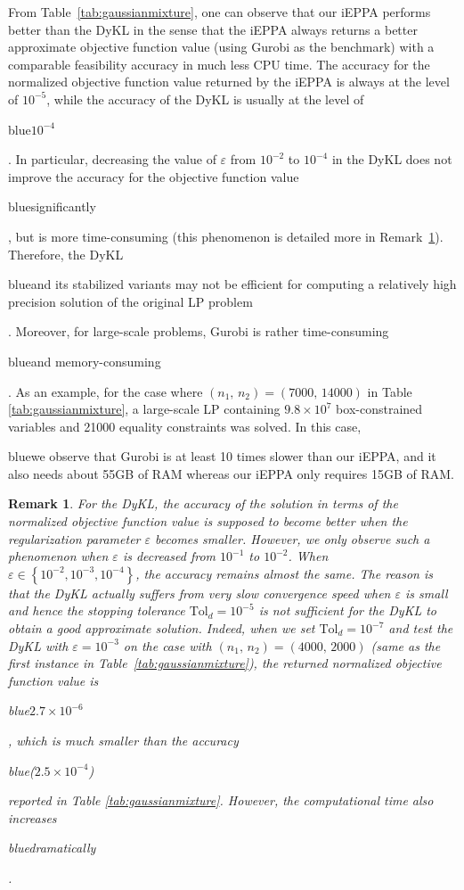 \documentclass[10pt]{article}
\newcommand{\blue}[1]{\begin{color}{blue}#1\end{color}}
\newtheorem{remark}{Remark}
\begin{document}
From Table~\ref{tab:gaussianmixture}, one can observe that our iEPPA performs better than the DyKL in the sense that the iEPPA always returns a better approximate objective function value (using Gurobi as the benchmark) with a comparable feasibility accuracy in much less CPU time. The accuracy for the normalized objective function value returned by the iEPPA is always at the level of $10^{-5}$, while the accuracy of the DyKL is usually at the level of \blue{$10^{-4}$}. In particular, decreasing the value of $\varepsilon$ from $10^{-2}$ to $10^{-4}$ in the DyKL does not improve the accuracy for the objective function value \blue{significantly}, but is more time-consuming (this phenomenon is detailed more in Remark~\ref{rmk:accdykl}). Therefore, the DyKL \blue{and its stabilized variants may not be efficient for computing a relatively high precision solution of the original LP problem}.
Moreover, for large-scale problems, Gurobi is rather time-consuming \blue{and memory-consuming}. As an example, for the case where $(n_1, \,n_2)=(7000,\,14000)$ in Table \ref{tab:gaussianmixture}, a large-scale LP containing $9.8\times10^{7}$ box-constrained variables and 21000 equality constraints was solved. In this case, \blue{we observe that Gurobi is at least 10 times slower than our iEPPA, and it also needs about 55GB of RAM whereas our iEPPA only requires 15GB of RAM.}



\begin{remark}\label{rmk:accdykl}
For the DyKL, the accuracy of the solution in terms of the normalized objective function value is supposed to become better when the regularization parameter $\varepsilon$ becomes smaller. However, we only observe such a phenomenon when $\varepsilon$ is decreased from $10^{-1}$ to $10^{-2}$. When $\varepsilon \in \left\{ 10^{-2},10^{-3},10^{-4} \right\}$, the accuracy remains almost the same.
The reason is that the DyKL actually suffers from very slow convergence speed when $\varepsilon$ is small and hence the stopping tolerance $\text{Tol}_d=10^{-5}$ is not sufficient for the DyKL to obtain a good approximate solution. Indeed, when we set $\text{Tol}_d = 10^{-7}$ and test the DyKL with $\varepsilon = 10^{-3}$ on the case with $(n_1,\,n_2) = (4000, \,2000)$ (same as the first instance in Table~\ref{tab:gaussianmixture}), the returned normalized objective function value is \blue{$2.7\times 10^{-6}$}, which is much smaller than the accuracy \blue{($2.5\times10^{-4}$)} reported in Table \ref{tab:gaussianmixture}. However, the computational time also increases \blue{dramatically}.
\end{remark}
\end{document}
